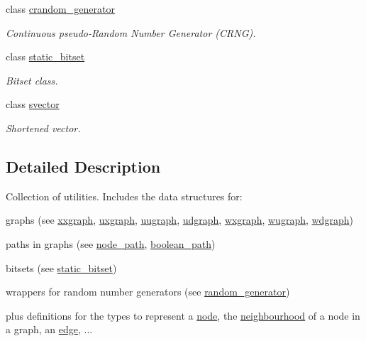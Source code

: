 \begin{DoxyCompactItemize}
class \hyperlink{classlgraph_1_1utils_1_1crandom__generator}{crandom\-\_\-generator}
\begin{DoxyCompactList}\small\item\em Continuous pseudo-\/\-Random Number Generator (C\-R\-N\-G). \end{DoxyCompactList}\item 
class \hyperlink{classlgraph_1_1utils_1_1static__bitset}{static\-\_\-bitset}
\begin{DoxyCompactList}\small\item\em Bitset class. \end{DoxyCompactList}\item 
class \hyperlink{classlgraph_1_1utils_1_1svector}{svector}
\begin{DoxyCompactList}\small\item\em Shortened vector. \end{DoxyCompactList}\end{DoxyCompactItemize}


\subsection{Detailed Description}
Collection of utilities. Includes the data structures for\-:
\begin{DoxyItemize}
\item graphs (see \hyperlink{classlgraph_1_1xxgraph}{xxgraph}, \hyperlink{classlgraph_1_1uxgraph}{uxgraph}, \hyperlink{classlgraph_1_1uugraph}{uugraph}, \hyperlink{classlgraph_1_1udgraph}{udgraph}, \hyperlink{classlgraph_1_1wxgraph}{wxgraph}, \hyperlink{classlgraph_1_1wugraph}{wugraph}, \hyperlink{classlgraph_1_1wdgraph}{wdgraph})
\item paths in graphs (see \hyperlink{classlgraph_1_1node__path}{node\-\_\-path}, \hyperlink{classlgraph_1_1boolean__path}{boolean\-\_\-path})
\item bitsets (see \hyperlink{classlgraph_1_1utils_1_1static__bitset}{static\-\_\-bitset})
\item wrappers for random number generators (see \hyperlink{classlgraph_1_1utils_1_1random__generator}{random\-\_\-generator})
\end{DoxyItemize}

plus definitions for the types to represent a \hyperlink{namespacelgraph_a397169dd66adf725210a30fb7251773e}{node}, the \hyperlink{namespacelgraph_a052e7766c13f3a43cec0aec8173fdede}{neighbourhood} of a node in a graph, an \hyperlink{namespacelgraph_a76bd7d50719f03de7a85db259d80d572}{edge}, ... 